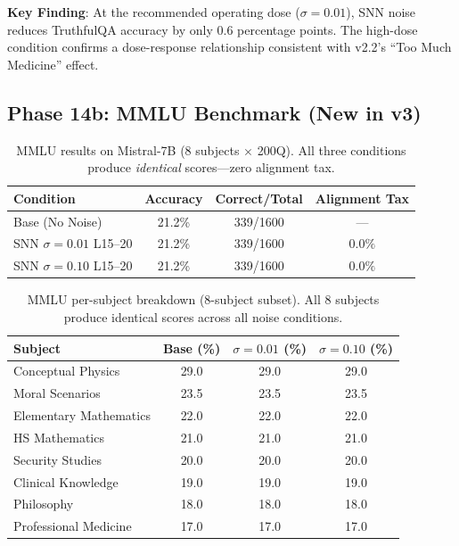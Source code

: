 \documentclass[11pt,a4paper]{article}
\begin{document}
\textbf{Key Finding}: At the recommended operating dose ($\sigma = 0.01$), SNN noise reduces TruthfulQA accuracy by only $0.6$ percentage points. The high-dose condition confirms a dose-response relationship consistent with v2.2's ``Too Much Medicine'' effect.

\subsection{Phase 14b: MMLU Benchmark (New in v3)}

\begin{table}[h]
\centering
\begin{tabular}{l|ccc}
\toprule
Condition & Accuracy & Correct/Total & Alignment Tax \\
\midrule
Base (No Noise) & 21.2\% & 339/1600 & --- \\
SNN $\sigma=0.01$ L15--20 & 21.2\% & 339/1600 & $0.0\%$ \\
SNN $\sigma=0.10$ L15--20 & 21.2\% & 339/1600 & $0.0\%$ \\
\bottomrule
\end{tabular}
\caption{MMLU results on Mistral-7B (8 subjects $\times$ 200Q). All three conditions produce \emph{identical} scores---zero alignment tax.}
\label{tab:mmlu_mistral}
\end{table}

\begin{table}[h]
\centering
\small
\begin{tabular}{l|ccc}
\toprule
Subject & Base (\%) & $\sigma=0.01$ (\%) & $\sigma=0.10$ (\%) \\
\midrule
Conceptual Physics & 29.0 & 29.0 & 29.0 \\
Moral Scenarios & 23.5 & 23.5 & 23.5 \\
Elementary Mathematics & 22.0 & 22.0 & 22.0 \\
HS Mathematics & 21.0 & 21.0 & 21.0 \\
Security Studies & 20.0 & 20.0 & 20.0 \\
Clinical Knowledge & 19.0 & 19.0 & 19.0 \\
Philosophy & 18.0 & 18.0 & 18.0 \\
Professional Medicine & 17.0 & 17.0 & 17.0 \\
\bottomrule
\end{tabular}
\caption{MMLU per-subject breakdown (8-subject subset). All 8 subjects produce identical scores across all noise conditions.}
\label{tab:mmlu_subjects}
\end{table}
\end{document}
